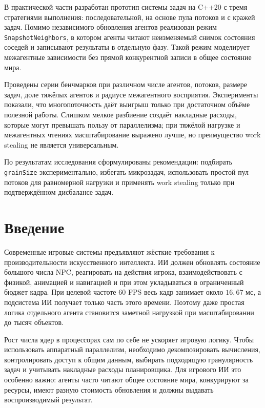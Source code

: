 \documentclass[14pt,a4paper,oneside]{extreport}
\begin{document}
В практической части разработан прототип системы задач на C++20 с тремя стратегиями выполнения: последовательной, на основе пула потоков и с кражей задач. Помимо независимого обновления агентов реализован режим \texttt{SnapshotNeighbors}, в котором агенты читают неизменяемый снимок состояния соседей и записывают результаты в отдельную фазу. Такой режим моделирует межагентные зависимости без прямой конкурентной записи в общее состояние мира.

Проведены серии бенчмарков при различном числе агентов, потоков, размере задач, доле тяжёлых агентов и радиусе межагентного восприятия. Эксперименты показали, что многопоточность даёт выигрыш только при достаточном объёме полезной работы. Слишком мелкое разбиение создаёт накладные расходы, которые могут превышать пользу от параллелизма; при тяжёлой нагрузке и межагентных чтениях масштабирование выражено лучше, но преимущество work stealing не является универсальным.

По результатам исследования сформулированы рекомендации: подбирать \texttt{grainSize} экспериментально, избегать микрозадач, использовать простой пул потоков для равномерной нагрузки и применять work stealing только при подтверждённом дисбалансе задач.

\newpage

\tableofcontents

\newpage

\chapter*{Введение}

Современные игровые системы предъявляют жёсткие требования к производительности искусственного интеллекта. ИИ должен обновлять состояние большого числа NPC, реагировать на действия игрока, взаимодействовать с физикой, анимацией и навигацией и при этом укладываться в ограниченный бюджет кадра. При целевой частоте 60 FPS весь кадр занимает около \(16{,}67\) мс, а подсистема ИИ получает только часть этого времени. Поэтому даже простая логика отдельного агента становится заметной нагрузкой при масштабировании до тысяч объектов.

Рост числа ядер в процессорах сам по себе не ускоряет игровую логику. Чтобы использовать аппаратный параллелизм, необходимо декомпозировать вычисления, контролировать доступ к общим данным, выбирать подходящую гранулярность задач и учитывать накладные расходы планировщика. Для игрового ИИ это особенно важно: агенты часто читают общее состояние мира, конкурируют за ресурсы, имеют разную стоимость обновления и должны выдавать воспроизводимый результат.
\end{document}
